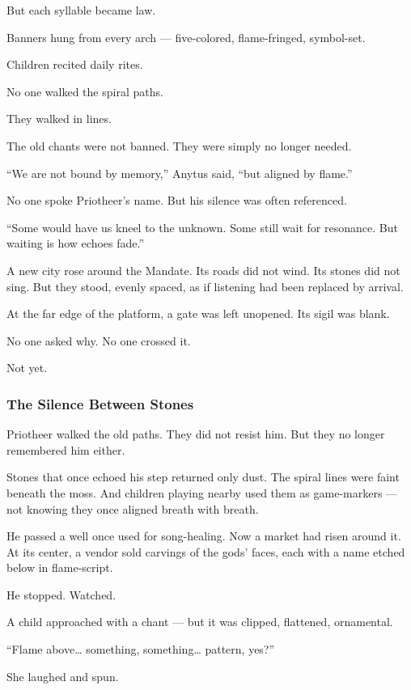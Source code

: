 \documentclass[12pt]{article}
\begin{document}
But each syllable became law.

Banners hung from every arch — five-colored, flame-fringed, symbol-set.  

Children recited daily rites.  

No one walked the spiral paths.  

They walked in lines.

The old chants were not banned.  
They were simply no longer needed.

 “We are not bound by memory,” Anytus said,  
 “but aligned by flame.”

No one spoke Priotheer’s name.  
But his silence was often referenced.

 “Some would have us kneel to the unknown.  
 Some still wait for resonance.  
 But waiting is how echoes fade.”

A new city rose around the Mandate.  
Its roads did not wind.  
Its stones did not sing.  
But they stood, evenly spaced, as if listening had been replaced by arrival.

At the far edge of the platform, a gate was left unopened.  
Its sigil was blank.

No one asked why.  
No one crossed it.

Not yet.


\dotfill

\subsubsection{The Silence Between Stones}

Priotheer walked the old paths.  
They did not resist him.  
But they no longer remembered him either.

Stones that once echoed his step returned only dust.  
The spiral lines were faint beneath the moss.  
And children playing nearby used them as game-markers —  
not knowing they once aligned breath with breath.

He passed a well once used for song-healing.  
Now a market had risen around it.  
At its center, a vendor sold carvings of the gods’ faces,  
each with a name etched below in flame-script.

He stopped.  
Watched.

A child approached with a chant —  
but it was clipped, flattened, ornamental.

 “Flame above… something, something… pattern, yes?”

She laughed and spun.
\end{document}
